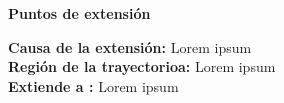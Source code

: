 

\begin{large}
	\textbf{Puntos de extensión}\\
\end{large}	

\textbf{Causa de la extensión:} Lorem ipsum\\
\textbf{Región de la trayectorioa:} Lorem ipsum\\
\textbf{Extiende a :} Lorem ipsum\\\\